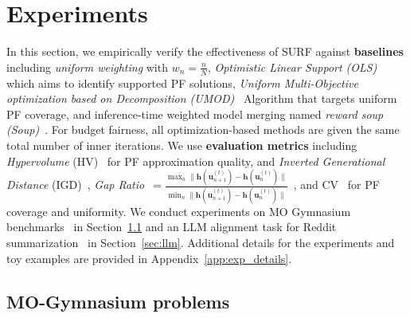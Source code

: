 \documentclass{article}
\newcommand{\bu}{\mathbf{u}}
\newcommand{\h}{\mathbf{h}}
\begin{document}
\section{Experiments}
\label{sec:exp}
\vspace{-0.2cm}
In this section, we empirically verify the effectiveness of SURF against \textbf{baselines} including \textit{uniform weighting} with $w_n=\frac{n}{N}$, \textit{Optimistic Linear Support (OLS)}~\citep{barrett2008learning} which aims to identify supported PF solutions, \textit{Uniform Multi-Objective optimization based on Decomposition (UMOD)}~\citep{zhang2024gliding} Algorithm that targets uniform PF coverage, and inference-time weighted model merging named \textit{reward soup (Soup)}~\citep{rame2023rewarded}. For budget fairness, all optimization-based methods are given the same total number of inner iterations.
We use \textbf{evaluation metrics} including \textit{Hypervolume} (HV)~\citep{zitzler1999multiobjective} for PF approximation quality, and \textit{Inverted Generational Distance} (IGD)~\citep{bogoya2019averaged}, 
\textit{Gap Ratio}~$=\frac{\max_n \|\h(\bu_{n+1}^{(t)})-\h(\bu_{n}^{(t)})\|}{\min_n \|\h(\bu_{n+1}^{(t)})-\h(\bu_{n}^{(t)})\|}$~\citep{roijers2013survey}, and CV~\citep{everitt2002cambridge} for PF coverage and uniformity. 
We conduct experiments on MO Gymnasium benchmarks~\citep{felten_toolkit_2023} in Section~\ref{sec:mogym} and an LLM alignment task for Reddit summarization~\citep{volske2017tl} in Section~\ref{sec:llm}. 
Additional details for the experiments  and toy examples are provided in Appendix~\ref{app:exp_details}. 

\vspace{-0.2cm}
\subsection{MO-Gymnasium problems}
\label{sec:mogym}
\vspace{-0.2cm}
\end{document}
